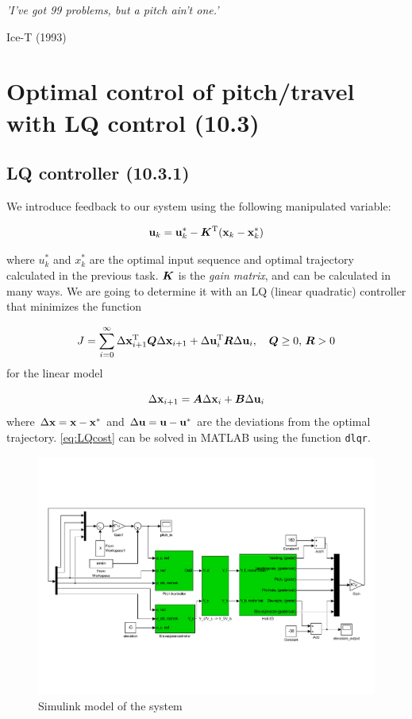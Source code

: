 \epigraph{\textit{'I've got 99 problems, but a pitch ain't one.'}}{Ice-T (1993)}

\section{Optimal control of pitch/travel with LQ control (10.3)}

\subsection{LQ controller (10.3.1)}

We introduce feedback to our system using the following manipulated variable:

\begin{equation}
	\mathbf{u}_k = \mathbf{u}_k^* - \bm{K} ^{\text{T}} (\mathbf{x}_k - \mathbf{x}_k^*)
\end{equation}

where $u_k^*$ and $x_k^*$ are the optimal input sequence and optimal trajectory calculated in the previous task. $\bm{K}$ is the \emph{gain matrix}, and can be calculated in many ways. We are going to determine it with an LQ (linear quadratic) controller that minimizes the function

\begin{equation} \label{eq:LQcost}
	J = \sum\limits_{i=0}^{\infty} \Delta \mathbf{x}_{i+1} ^{\text{T}} \bm{Q} \Delta \mathbf{x}_{i+1} + \Delta \mathbf{u}_{i} ^{\text{T}} \bm{R} \Delta \mathbf{u}_{i}, \quad \bm{Q} \geq 0, \, \bm{R} > 0
\end{equation}
for the linear model

\begin{equation}
	 \Delta \mathbf{x}_{i+1} = \bm{A} \Delta \mathbf{x}_{i} + \bm{B} \Delta \mathbf{u}_{i}
\end{equation}
where $\Delta \mathbf{x} = \mathbf{x} - \mathbf{x}^*$ and $\Delta \mathbf{u} = \mathbf{u} - \mathbf{u}^*$ are the deviations from the optimal trajectory. \eqref{eq:LQcost} can be solved in MATLAB using the function \texttt{dlqr}. 

\begin{figure}[H]
	\centering
	\includegraphics[width=\textwidth, trim=2cm 5cm 2cm 2cm]{simulinkmodels/heldag3}
	\caption{Simulink model of the system}
	\label{fig:heldag3}
\end{figure}

